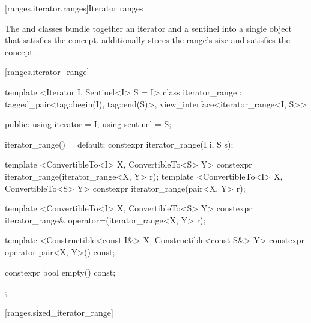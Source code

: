 [ranges.iterator.ranges]{Iterator ranges}

\pnum
The  and  classes bundle together an
iterator and a sentinel into a single object that satisfies the  concept.
 additionally stores the range's size and satisfies the
 concept.

[ranges.iterator_range]{}

%
\begin{codeblock}
template <Iterator I, Sentinel<I> S = I>
class iterator_range
  : tagged_pair<tag::begin(I), tag::end(S)>,
    view_interface<iterator_range<I, S>> {
public:
  using iterator = I;
  using sentinel = S;

  iterator_range() = default;
  constexpr iterator_range(I i, S s);

  template <ConvertibleTo<I> X, ConvertibleTo<S> Y>
    constexpr iterator_range(iterator_range<X, Y> r);
  template <ConvertibleTo<I> X, ConvertibleTo<S> Y>
    constexpr iterator_range(pair<X, Y> r);

  template <ConvertibleTo<I> X, ConvertibleTo<S> Y>
    constexpr iterator_range& operator=(iterator_range<X, Y> r);

  template <Constructible<const I&> X, Constructible<const S&> Y>
    constexpr operator pair<X, Y>() const;

  constexpr bool empty() const;
};
\end{codeblock}

[ranges.sized_iterator_range]{}

